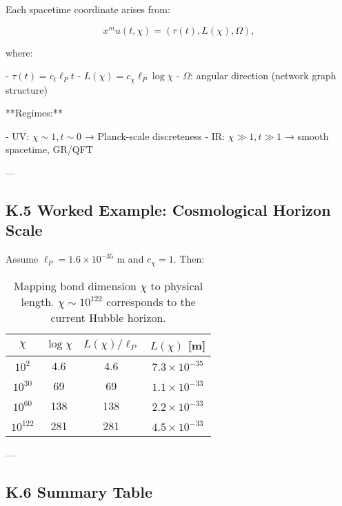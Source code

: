 \documentclass[11pt]{article}
\def\mu{mu}
\begin{document}
Each spacetime coordinate arises from:

\[
x^\mu(t, \chi) = (\tau(t), L(\chi), \Omega),
\]

where:

- \( \tau(t) = c_t \ell_P t \)
- \( L(\chi) = c_\chi \ell_P \log \chi \)
- \( \Omega \): angular direction (network graph structure)

**Regimes:**

- UV: \( \chi \sim 1, t \sim 0 \) → Planck-scale discreteness
- IR: \( \chi \gg 1, t \gg 1 \) → smooth spacetime, GR/QFT

---

\subsection*{K.5 Worked Example: Cosmological Horizon Scale}

Assume \( \ell_P = 1.6 \times 10^{-35} \) m and \( c_\chi = 1 \). Then:

\begin{table}[H]
\centering
\renewcommand{\arraystretch}{1.2}
\begin{tabular}{|c|c|c|c|}
\hline
\( \chi \) & \( \log \chi \) & \( L(\chi)/\ell_P \) & \( L(\chi) \) [m] \\
\hline
\( 10^2 \) & 4.6 & 4.6 & \( 7.3 \times 10^{-35} \) \\
\( 10^{30} \) & 69 & 69 & \( 1.1 \times 10^{-33} \) \\
\( 10^{60} \) & 138 & 138 & \( 2.2 \times 10^{-33} \) \\
\( 10^{122} \) & 281 & 281 & \( 4.5 \times 10^{-33} \) \\
\hline
\end{tabular}
\caption{Mapping bond dimension \( \chi \) to physical length. \( \chi \sim 10^{122} \) corresponds to the current Hubble horizon.}
\label{tab:chi-length}
\end{table}

---

\subsection*{K.6 Summary Table}
\end{document}
